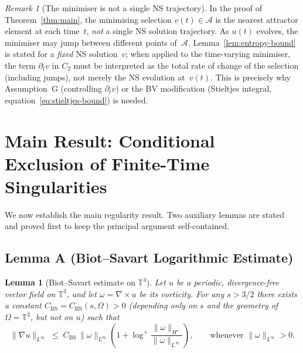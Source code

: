 \documentclass[12pt,a4paper]{article}
\theoremstyle{definition}
\theoremstyle{plain}
\newtheorem{lemma}[definition]{Lemma}
\theoremstyle{remark}
\newtheorem{remark}[definition]{Remark}
\begin{document}
\begin{remark}[The minimiser is not a single NS trajectory]
\label{rem:minimiser-trajectory}
In the proof of Theorem~\ref{thm:main}, the minimising selection
$v(t) \in \mathcal{A}$ is the nearest attractor element at each time~$t$,
\emph{not} a single NS solution trajectory.  As $u(t)$ evolves, the
minimiser may jump between different points of~$\mathcal{A}$.
Lemma~\ref{lem:entropy-bound} is stated for a \emph{fixed} NS solution~$v$;
when applied to the time-varying minimiser, the term $\partial_t v$ in
$C_2$ must be interpreted as the total rate of change of the selection
(including jumps), not merely the NS evolution at~$v(t)$.  This is
precisely why Assumption~G (controlling $\partial_t v$) or the BV
modification (Stieltjes integral, equation~\eqref{eq:stieltjes-bound})
is needed.
\end{remark}

\section{Main Result: Conditional Exclusion of Finite-Time Singularities}

We now establish the main regularity result. Two auxiliary lemmas are stated and
proved first to keep the principal argument self-contained.

\subsection*{Lemma A (Biot--Savart Logarithmic Estimate)}
\begin{lemma}[Biot--Savart estimate on $\mathbb{T}^3$]
\label{lem:BS}
Let $u$ be a periodic, divergence-free vector field on $\mathbb{T}^3$, and let
$\omega = \nabla\times u$ be its vorticity.  For any $s > 3/2$ there exists a
constant $C_{\mathrm{BS}} = C_{\mathrm{BS}}(s,\Omega) > 0$ (depending only on
$s$ and the geometry of $\Omega = \mathbb{T}^3$, but \emph{not} on $u$) such that
\begin{equation}\label{eq:BS}
    \|\nabla u\|_{L^\infty}
    \;\le\;
    C_{\mathrm{BS}}\,\|\omega\|_{L^\infty}
    \!\left(1 + \log^+\!\frac{\|\omega\|_{H^s}}{\|\omega\|_{L^\infty}}\right),
    \qquad \text{whenever } \|\omega\|_{L^\infty} > 0.
\end{equation}
\end{lemma}
\end{document}
